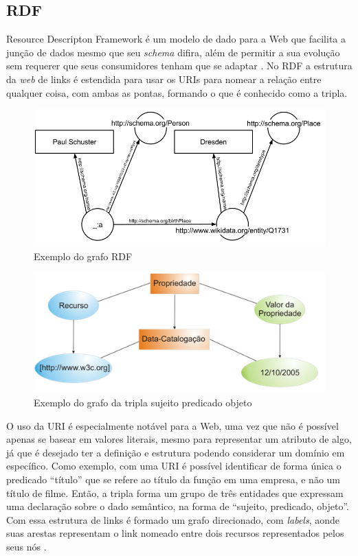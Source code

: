 \subsection{RDF}

Resource Descripton Framework é um modelo de dado para a Web que facilita a junção de dados mesmo que seu \textit{schema} difira, além de permitir a sua evolução sem requerer que seus consumidores tenham que se adaptar \citep{W3CRDF}. No RDF a estrutura da \textit{web} de links é estendida para usar os \ac{URI}s para nomear a relação entre qualquer coisa, com ambas as pontas, formando o que é conhecido como a tripla.

\begin{figure}
	\centering
	\includegraphics[scale=0.40]{imagens/rdf_example1.png}
	\caption{Exemplo do grafo RDF \citep{RDFWikiImage}}
	\label{fig:rdf_graph}
\end{figure}

\begin{figure}
	\centering
	\includegraphics[scale=0.65]{imagens/rdf_example2.png}
	\caption{Exemplo do grafo da tripla sujeito predicado objeto \citep{WebSemanticaDevmedia}}
	\label{fig:rdf_graph2}
\end{figure}

O uso da URI é especialmente notável para a Web, uma vez que não é possível apenas se basear em valores literais, mesmo para representar um atributo de algo, já que é desejado ter a definição e estrutura podendo considerar um domínio em específico. Como exemplo, com uma URI é possível identificar de forma única o predicado “título” que se refere ao título da função em uma empresa, e não um título de filme. Então, a tripla forma um grupo de três entidades que expressam uma declaração sobre o dado semântico, na forma de “sujeito, predicado, objeto”. Com essa estrutura de links é formado um grafo direcionado, com \textit{labels}, aonde suas arestas representam o link nomeado entre dois recursos representados pelos seus nós \citep{W3CRDF}.

